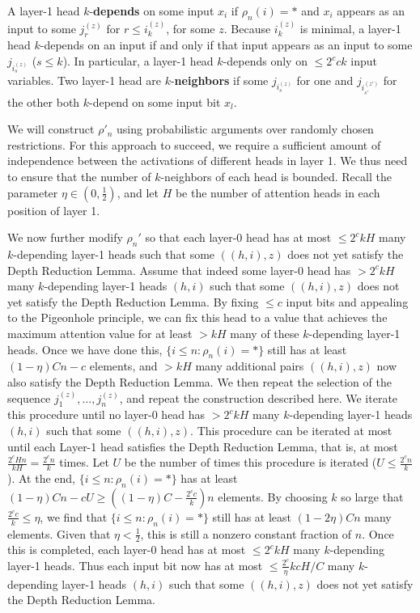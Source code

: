 \documentclass[11pt,a4paper]{article}
\begin{document}
A layer-1 head $k$-\textbf{depends} on some input $x_i$ if $\rho_n(i) = *$ and $x_i$ appears as an input to some $j_r^{(z)}$ for $r \leq i_k^{(z)}$, for some $z$.
Because $i_k^{(z)}$ is minimal, a layer-1 head $k$-depends on an input if and only if that input appears as an input to some $j_{i_s^{(z)}}$ ($s \leq k$).
In particular, a layer-1 head $k$-depends only on $\leq 2^c ck$ input variables.
Two layer-1 head are $k$-\textbf{neighbors} if some $j_{i_s^{(z)}}$ for one and $j_{i_{s'}^{(z')}}$ for the other both $k$-depend on some input bit $x_l$.

We will construct $\rho'_n$ using probabilistic arguments over randomly chosen restrictions.
For this approach to succeed, we require a  sufficient amount of independence between the activations of different heads in layer 1.
We thus need to ensure that the number of $k$-neighbors of each head is bounded.
Recall the parameter $\eta \in (0,\frac{1}{2})$, and let $H$ be the number of attention heads in each position of layer 1.



We now further modify $\rho_n'$ so that each layer-0 head has at most $\leq 2^c kH$ many $k$-depending layer-1 heads  such that some $((h,i),z)$ does not yet satisfy the Depth Reduction Lemma.
Assume that indeed some layer-0 head  has $>  2^c kH$ many $k$-depending layer-1 heads $(h,i)$ such that some $((h,i),z)$ does not yet satisfy the Depth Reduction Lemma.
By fixing $\leq c$ input bits and appealing to the Pigeonhole principle, we can fix this head to a value that achieves the maximum attention value for at least $> kH$ many of these $k$-depending layer-1 heads.
Once we have done this, 
$\{i \leq n: \rho_n(i) = *\}$ still has at least $(1-\eta) C n - c$ elements, and $> kH$ many additional pairs $((h,i),z)$ now also satisfy the Depth Reduction Lemma.
We then repeat the selection of the sequence $j_1^{(z)}, \dots, j_n^{(z)}$, and repeat the construction described here.
We iterate this procedure until no layer-0 head has $>  2^c kH$ many $k$-depending layer-1 heads $(h,i)$ such that some $((h,i),z)$.
This procedure can be iterated at most until each Layer-1 head satisfies the Depth Reduction Lemma, that is, at most $\frac{2^c H n}{kH} = \frac{2^c n}{k}$ times.
Let $U$ be the number of times this procedure is iterated ($U \leq \frac{2^c n}{k}$).
At the end, $\{i \leq n: \rho_n(i) = *\}$ has at least $(1-\eta) C n - cU \geq ((1-\eta) C  - \frac{2^c c}{k}) n$ elements.
By choosing $k$ so large that $\frac{2^c c}{k} \leq \eta$, we find that $\{i \leq n: \rho_n(i) = *\}$  still has at least $(1-2\eta) C n$ many elements.
Given that $\eta < \frac{1}{2}$, this is still a nonzero constant fraction of $n$.
Once this is completed, each layer-0 head has at most $\leq 2^c kH$ many $k$-depending layer-1 heads.
Thus each input bit now has at most $\leq \frac{2^c}{\eta}kcH/C$ many $k$-depending layer-1 heads $(h,i)$ such that some $((h,i),z)$ does not yet satisfy the Depth Reduction Lemma.
\end{document}
